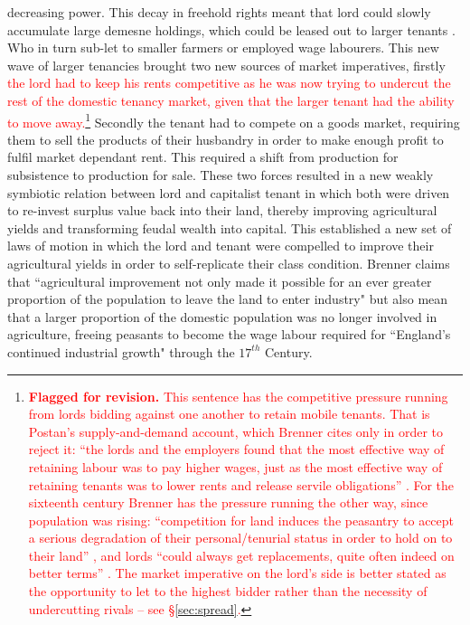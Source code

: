 \documentclass[11pt,english]{article}
\newcommand{\flagged}[1]{\textcolor{red}{#1}}
\begin{document}
decreasing power. This decay in freehold rights meant that lord could slowly accumulate large demesne holdings, which could be leased out to larger tenants \cite[p.7]{hoyle1990tenure}. Who in turn sub-let to smaller farmers or employed wage labourers. This new wave of larger tenancies brought two new sources of market imperatives, firstly \flagged{the lord had to keep his rents competitive as he was now trying to undercut the rest of the domestic tenancy market, given that the larger tenant had the ability to move away.}\footnote{\flagged{\textbf{Flagged for revision.} This sentence has the competitive pressure running from lords bidding against one another to retain mobile tenants. That is Postan's supply-and-demand account, which Brenner cites only in order to reject it: ``the lords and the employers found that the most effective way of retaining labour was to pay higher wages, just as the most effective way of retaining tenants was to lower rents and release servile obligations'' \cite[p.39, n.17, quoting Postan]{brenner1976agrarian}. For the sixteenth century Brenner has the pressure running the other way, since population was rising: ``competition for land induces the peasantry to accept a serious degradation of their personal/tenurial status in order to hold on to their land'' \cite[p.38]{brenner1976agrarian}, and lords ``could always get replacements, quite often indeed on better terms'' \cite[p.44]{brenner1976agrarian}. The market imperative on the lord's side is better stated as the opportunity to let to the highest bidder rather than the necessity of undercutting rivals -- see \S\ref{sec:spread}.}} Secondly the tenant had to compete on a goods market, requiring them to sell the products of their husbandry in order to make enough profit to fulfil market dependant rent. This required a shift from production for subsistence to production for sale. These two forces resulted in a new weakly symbiotic relation between lord and capitalist tenant in which both were driven to re-invest surplus value back into their land, thereby improving agricultural yields and transforming feudal wealth into capital. This established a new set of laws of motion in which the lord and tenant were compelled to improve their agricultural yields in order to self-replicate their class condition. Brenner claims that ``agricultural improvement not only made it possible for an ever greater proportion of the population to leave the land to enter industry" \cite[p.67]{brenner1976agrarian} but also mean that a larger proportion of the domestic population was no longer involved in agriculture, freeing peasants to become the wage labour required for ``England's continued industrial growth" \cite[p.67]{brenner1976agrarian} through the $17^{th}$ Century.
\end{document}
